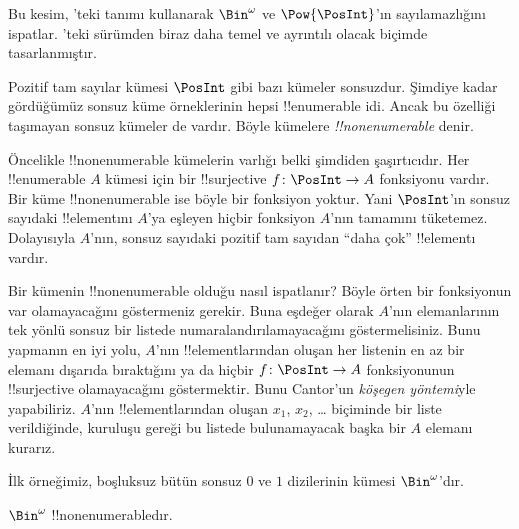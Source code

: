 \documentclass[../../../include/open-logic-section]{subfiles}
\begin{document}


\begin{editorial}
  Bu kesim, 'teki tanımı kullanarak $\Bin^\omega$ ve
  $\Pow{\PosInt}$'ın sayılamazlığını ispatlar. 'teki
  sürümden biraz daha temel ve ayrıntılı olacak biçimde tasarlanmıştır.
\end{editorial}

Pozitif tam sayılar kümesi $\PosInt$ gibi bazı kümeler sonsuzdur. Şimdiye
kadar gördüğümüz sonsuz küme örneklerinin hepsi !!{enumerable} idi. Ancak bu
özelliği taşımayan sonsuz kümeler de vardır. Böyle kümelere
\emph{!!{nonenumerable}} denir.

Öncelikle !!{nonenumerable} kümelerin varlığı belki şimdiden şaşırtıcıdır.
Her !!{enumerable} $A$ kümesi için bir !!{surjective} $f\colon\PosInt\to A$
fonksiyonu vardır. Bir küme !!{nonenumerable} ise böyle bir fonksiyon yoktur.
Yani $\PosInt$'ın sonsuz sayıdaki !!{element}ını $A$'ya eşleyen hiçbir
fonksiyon $A$'nın tamamını tüketemez. Dolayısıyla $A$'nın, sonsuz sayıdaki
pozitif tam sayıdan ``daha çok'' !!{element}ı vardır.

Bir kümenin !!{nonenumerable} olduğu nasıl ispatlanır? Böyle örten bir
fonksiyonun var olamayacağını göstermeniz gerekir. Buna eşdeğer olarak
$A$'nın elemanlarının tek yönlü sonsuz bir listede numaralandırılamayacağını
göstermelisiniz. Bunu yapmanın en iyi yolu, $A$'nın !!{element}larından oluşan
her listenin en az bir elemanı dışarıda bıraktığını ya da hiçbir
$f\colon\PosInt\to A$ fonksiyonunun !!{surjective} olamayacağını
göstermektir. Bunu Cantor'un \emph{köşegen yöntemi}yle yapabiliriz. $A$'nın
!!{element}larından oluşan $x_1$, $x_2$, \dots{} biçiminde bir liste verildiğinde,
kuruluşu gereği bu listede bulunamayacak başka bir $A$ elemanı kurarız.

İlk örneğimiz, boşluksuz bütün sonsuz $0$ ve $1$ dizilerinin kümesi
$\Bin^\omega$'dır.

\begin{thm}
$\Bin^\omega$ !!{nonenumerable}dır.
\end{thm}
\end{document}

